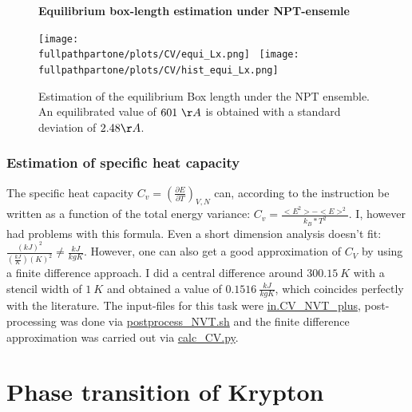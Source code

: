 \documentclass[10pt,a4paper]{report}
\def \pathpartone {../../1_three-dimensional_atomic_system}
\def \fullpathpartone {/home/lukas/Desktop/project/independence/atomistic_modeling/exam/1_three-dimensional_atomic_system}
\newcommand*{\figuretitle}[1]{%
    {\centering%
    \textbf{#1}%
    \par\medskip}%
}
\begin{document}
\begin{center}
\begin{figure}[h]
\figuretitle{Equilibrium box-length estimation under NPT-ensemle}
\texttt{[image: \\fullpathpartone/plots/CV/equi\_Lx.png]}~
\texttt{[image: \\fullpathpartone/plots/CV/hist\_equi\_Lx.png]}
\caption[Equilibrium box-length estimation under NPT-ensemle]{Estimation of the equilibrium Box length under the NPT ensemble. An equilibrated  value of $601~\AA$ is obtained with a standard deviation of $2.48 \AA$.}
\label{fig:p1_CV_equi_NPT_lx}
\end{figure}
\end{center}


\subsubsection{Estimation of specific heat capacity}
The specific heat capacity $C_v=\left(\frac{\partial E}{\partial T}\right)_{V,N}$ can, according to the instruction be written as a function of the total energy variance: $C_v=\frac{<E^2>-<E>^2}{k_B*T^2}$. I, however had problems with this formula. Even a short dimension analysis doesn't fit: $\frac{ {(kJ)}^2     }{ (\frac{kJ}{K}) {(K)}^2 } \neq \frac{kJ}{kg K}$.
However, one can also get a good approximation of $C_V$ by using a finite difference approach.
I did a central difference around $300.15~K$ with a stencil width of $1~K$ and obtained a value of $0.1516~\frac{kJ}{kg K}$, which coincides perfectly with the literature.
The input-files for this task were \href{\pathpartone/in.CV_NVT_plus}{in.CV\_NVT\_plus}, post-processing was done via \href{\pathpartone/postprocess_NVT.sh}{postprocess\_NVT.sh} and the finite difference approximation was carried out via \href{\pathpartone/calc_CV.py}{calc\_CV.py}.









\section{Phase transition of Krypton}
\end{document}

